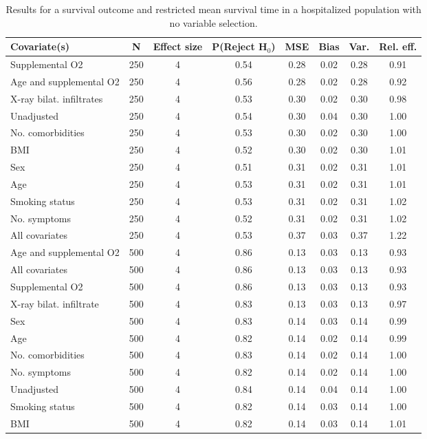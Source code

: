 \documentclass{article}
\begin{document}
\begin{table}
\caption{Results for a survival outcome and restricted mean survival time in a hospitalized population with no variable selection.}
\hspace*{-1.5cm}\begin{tabular}{lccccccc} \toprule
Covariate(s) & N & Effect size & P(Reject H$_0$) & MSE & Bias & Var. & Rel. eff.\\ \midrule
Supplemental O2 & 250 & 4 & 0.54 & 0.28 & 0.02 & 0.28 & 0.91\\
Age and supplemental O2 & 250 & 4 & 0.56 & 0.28 & 0.02 & 0.28 & 0.92\\
X-ray bilat. infiltrates & 250 & 4 & 0.53 & 0.30 & 0.02 & 0.30 & 0.98\\
Unadjusted & 250 & 4 & 0.54 & 0.30 & 0.04 & 0.30 & 1.00\\
No. comorbidities & 250 & 4 & 0.53 & 0.30 & 0.02 & 0.30 & 1.00\\
BMI & 250 & 4 & 0.52 & 0.30 & 0.02 & 0.30 & 1.01\\
Sex & 250 & 4 & 0.51 & 0.31 & 0.02 & 0.31 & 1.01\\
Age & 250 & 4 & 0.53 & 0.31 & 0.02 & 0.31 & 1.01\\
Smoking status & 250 & 4 & 0.53 & 0.31 & 0.02 & 0.31 & 1.02\\
No. symptoms & 250 & 4 & 0.52 & 0.31 & 0.02 & 0.31 & 1.02\\
All covariates & 250 & 4 & 0.53 & 0.37 & 0.03 & 0.37 & 1.22\\ \midrule
Age and supplemental O2 & 500 & 4 & 0.86 & 0.13 & 0.03 & 0.13 & 0.93\\
All covariates & 500 & 4 & 0.86 & 0.13 & 0.03 & 0.13 & 0.93\\
Supplemental O2 & 500 & 4 & 0.86 & 0.13 & 0.03 & 0.13 & 0.93\\
X-ray bilat. infiltrate & 500 & 4 & 0.83 & 0.13 & 0.03 & 0.13 & 0.97\\
Sex & 500 & 4 & 0.83 & 0.14 & 0.03 & 0.14 & 0.99\\
Age & 500 & 4 & 0.82 & 0.14 & 0.02 & 0.14 & 0.99\\
No. comorbidities & 500 & 4 & 0.83 & 0.14 & 0.02 & 0.14 & 1.00\\
No. symptoms & 500 & 4 & 0.82 & 0.14 & 0.02 & 0.14 & 1.00\\
Unadjusted & 500 & 4 & 0.84 & 0.14 & 0.04 & 0.14 & 1.00\\
Smoking status & 500 & 4 & 0.82 & 0.14 & 0.03 & 0.14 & 1.00\\
BMI & 500 & 4 & 0.82 & 0.14 & 0.03 & 0.14 & 1.01\\ \midrule

\end{tabular}
\end{table}
\end{document}
